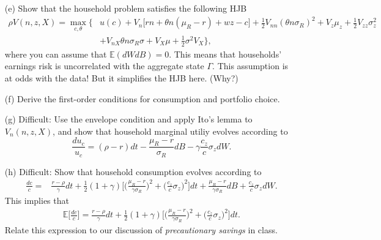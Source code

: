 \documentclass[11pt]{extarticle}
\theoremstyle{plain}
\theoremstyle{definition}
\begin{document}
\begin{enumerate}
\item [(e)] Show that the household problem satisfies the following HJB
\begin{align*}
	\rho V(n, z, X) = \max_{c, \theta} \bigg\{& u(c) + V_n \Big[ rn + \theta n (\mu_R - r) + wz - c \Big] + \frac{1}{2} V_{nn} (\theta n \sigma_R)^2 + V_z \mu_z + \frac{1}{2} V_{zz} \sigma_z^2 \\
	&+ V_{n X} \theta n \sigma_R \sigma + V_X \mu + \frac{1}{2} \sigma^2 V_{X} \bigg\},
\end{align*}
where you can assume that $\mathbb{E}(dW dB) = 0$. This means that households' earnings risk is uncorrelated with the aggregate state $\Gamma$. This assumption is at odds with the data! But it simplifies the HJB here. (Why?)

\item [(f)] Derive the first-order conditions for consumption and portfolio choice. 

\item [(g)] Difficult: Use the envelope condition and apply Ito's lemma to $V_n(n, z, X)$, and show that household marginal utiliy evolves according to 
\begin{equation*}
	\frac{d u_c}{u_c} = (\rho - r) dt -  \frac{\mu_R - r}{\sigma_R} dB  - \gamma \frac{c_z}{c} \sigma_z dW .
\end{equation*}

\item [(h)] Difficult: Show that household consumption evolves according to 
\begin{align*}
	\frac{dc}{c} = & \frac{r - \rho}{\gamma} dt + \frac{1}{2} (1+\gamma) \bigg[ \bigg( \frac{\mu_R - r}{\gamma \sigma_R} \bigg)^2 + \bigg( \frac{c_z}{c} \sigma_z \bigg)^2 \bigg] dt +  \frac{\mu_R - r}{\gamma \sigma_R} dB  + \frac{c_z}{c} \sigma_z dW .
\end{align*}
This implies that 
\begin{align*}
	\mathbb E\bigg[ \frac{dc}{c} \bigg] = \frac{r - \rho}{\gamma} dt + \frac{1}{2} (1+\gamma) \bigg[ \bigg( \frac{\mu_R - r}{\gamma \sigma_R} \bigg)^2 + \bigg( \frac{c_z}{c} \sigma_z \bigg)^2 \bigg] dt. 
\end{align*}
Relate this expression to our discussion of \textit{precautionary savings} in class.


\end{enumerate}
\end{document}
